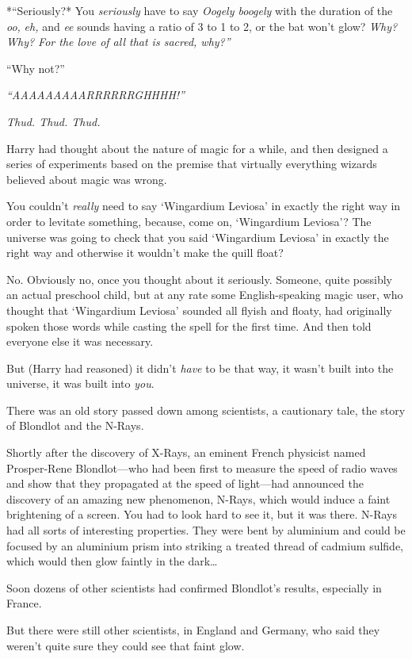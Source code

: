 *``Seriously?* You \emph{seriously} have to say \emph{Oogely boogely}
with the duration of the \emph{oo,} \emph{eh,} and \emph{ee} sounds
having a ratio of 3 to 1 to 2, or the bat won't glow? \emph{Why? Why?
For the love of all that is sacred, why?''}

``Why not?''

\emph{``AAAAAAAAARRRRRRGHHHH!''}

\emph{Thud. Thud. Thud.}

Harry had thought about the nature of magic for a while, and then
designed a series of experiments based on the premise that virtually
everything wizards believed about magic was wrong.

You couldn't \emph{really} need to say `Wingardium Leviosa' in exactly
the right way in order to levitate something, because, come on,
`Wingardium Leviosa'? The universe was going to check that you said
`Wingardium Leviosa' in exactly the right way and otherwise it wouldn't
make the quill float?

No. Obviously no, once you thought about it seriously. Someone, quite
possibly an actual preschool child, but at any rate some
English-speaking magic user, who thought that `Wingardium Leviosa'
sounded all flyish and floaty, had originally spoken those words while
casting the spell for the first time. And then told everyone else it was
necessary.

But (Harry had reasoned) it didn't \emph{have} to be that way, it wasn't
built into the universe, it was built into \emph{you}.

There was an old story passed down among scientists, a cautionary tale,
the story of Blondlot and the N-Rays.

Shortly after the discovery of X-Rays, an eminent French physicist named
Prosper-Rene Blondlot---who had been first to measure the speed of radio
waves and show that they propagated at the speed of light---had
announced the discovery of an amazing new phenomenon, N-Rays, which
would induce a faint brightening of a screen. You had to look hard to
see it, but it was there. N-Rays had all sorts of interesting
properties. They were bent by aluminium and could be focused by an
aluminium prism into striking a treated thread of cadmium sulfide, which
would then glow faintly in the dark\ldots{}

Soon dozens of other scientists had confirmed Blondlot's results,
especially in France.

But there were still other scientists, in England and Germany, who said
they weren't quite sure they could see that faint glow.

